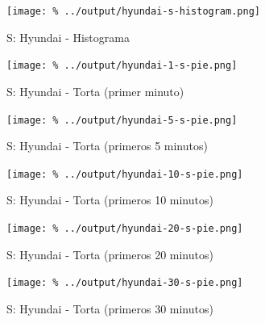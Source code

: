\documentclass[final,inline,a4paper,narroweqnarray]{ieee}
\begin{document}
    \begin{figure}[h]\begin{center}
      \texttt{[image: \%
      ../output/hyundai-s-histogram.png]}
      \caption{S: Hyundai - Histograma}
      \label{hyundai-s-histogram}
    \end{center}\end{figure}

    \begin{figure}[H]\begin{center}
      \texttt{[image: \%
      ../output/hyundai-1-s-pie.png]}
      \vspace{-3em}
      \caption{S: Hyundai - Torta (primer minuto)}
      \label{hyundai-1-s-pie}
    \end{center}\end{figure}
    \begin{figure}[H]\begin{center}
      \texttt{[image: \%
      ../output/hyundai-5-s-pie.png]}
      \vspace{-3em}
      \caption{S: Hyundai - Torta (primeros 5 minutos)}
      \label{hyundai-5-s-pie}
    \end{center}\end{figure}
    \begin{figure}[H]\begin{center}
      \texttt{[image: \%
      ../output/hyundai-10-s-pie.png]}
      \vspace{-3em}
      \caption{S: Hyundai - Torta (primeros 10 minutos)}
      \label{hyundai-10-s-pie}
    \end{center}\end{figure}
    \begin{figure}[H]\begin{center}
      \texttt{[image: \%
      ../output/hyundai-20-s-pie.png]}
      \vspace{-3em}
      \caption{S: Hyundai - Torta (primeros 20 minutos)}
      \label{hyundai-20-s-pie}
    \end{center}\end{figure}
    \begin{figure}[H]\begin{center}
      \texttt{[image: \%
      ../output/hyundai-30-s-pie.png]}
      \vspace{-3em}
      \caption{S: Hyundai - Torta (primeros 30 minutos)}
      \label{hyundai-30-s-pie}
    \end{center}\end{figure}
\end{document}
